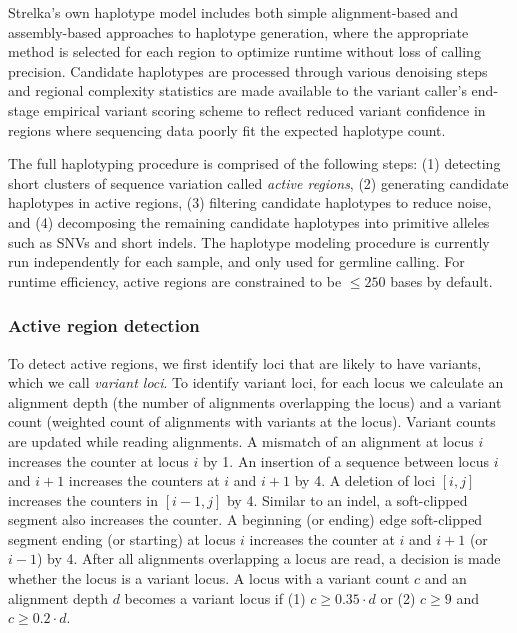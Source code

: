 \documentclass{article}
\begin{document}
Strelka's own haplotype model includes both simple alignment-based and assembly-based approaches to haplotype generation, where the appropriate method is selected for each region to optimize runtime without loss of calling precision. Candidate haplotypes are processed through various denoising steps and regional complexity statistics are made available to the variant caller's end-stage empirical variant scoring scheme to reflect reduced variant confidence in regions where sequencing data poorly fit the expected haplotype count.

The full haplotyping procedure is comprised of the following steps: (1) detecting short clusters of sequence variation called {\em active regions}, (2) generating candidate haplotypes in active regions, (3) filtering candidate haplotypes to reduce noise, and (4) decomposing the remaining candidate haplotypes into primitive alleles such as SNVs and short indels. The haplotype modeling procedure is currently run independently for each sample, and only used for germline calling. For runtime efficiency, active regions are constrained to be $\leq 250$ bases by default.


\subsubsection{Active region detection}
To detect active regions, we first identify loci that are likely to have variants, which we call {\em variant loci}. To identify variant loci, for each locus we calculate an alignment depth (the number of alignments overlapping the locus) and a variant count (weighted count of alignments with variants at the locus). Variant counts are updated while reading alignments. A mismatch of an alignment at locus $i$ increases the counter at locus $i$ by 1. An insertion of a sequence between locus $i$ and $i+1$ increases the counters at $i$ and $i+1$ by 4. A deletion of loci $[i,j]$ increases the counters in $[i-1,j]$ by 4. Similar to an indel, a soft-clipped segment also increases the counter. A beginning (or ending) edge soft-clipped segment ending (or starting) at locus $i$ increases the counter at $i$ and $i+1$ (or $i-1$) by 4. After all alignments overlapping a locus are read, a decision is made whether the locus is a variant locus. A locus with a variant count $c$ and an alignment depth $d$ becomes a variant locus if (1) $c \geq 0.35 \cdot d$ or (2) $c \geq 9$ and $c \geq 0.2 \cdot d$.
\end{document}
